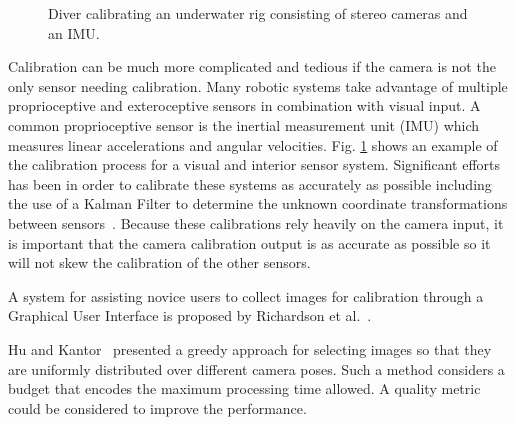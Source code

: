 \begin{figure}[t]
	\centering
	\caption{Diver calibrating an underwater rig consisting of stereo cameras and an IMU.}
	\label{fig:sensors}
\end{figure}

Calibration can be much more complicated and tedious if the camera is not the only sensor needing calibration. Many robotic systems take advantage of multiple proprioceptive and exteroceptive sensors in combination with visual input. A common proprioceptive sensor is the inertial measurement unit (IMU) which measures linear accelerations and angular velocities. Fig. \ref{fig:sensors} shows an example of the calibration process for a visual and interior sensor system. Significant efforts has been  in order to calibrate these systems as accurately as possible including the use of a Kalman Filter to determine the unknown coordinate transformations between sensors~\cite{4637877, doi:10.1177/0278364907079276, 2011_Kelly_Visual}. Because these calibrations rely heavily on the camera input, it is important that the camera calibration output is as accurate as possible so it will not skew the calibration of the other sensors. 



A system for assisting novice users to collect images for calibration through a Graphical User Interface is proposed by Richardson et al.~\cite{richardson2013iros}. 

Hu and Kantor~\cite{hu2016icra} presented a greedy approach for selecting images so that they are uniformly distributed over different camera poses. Such a method considers a budget that encodes the maximum processing time allowed. A quality metric could be considered to improve the performance.